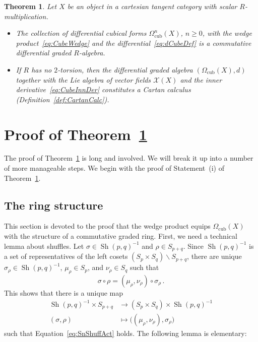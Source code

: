 \documentclass[12pt,reqno, a4paper]{amsart}
\numberwithin{equation}{section}
\theoremstyle{plain}
\newtheorem{Theorem}{Theorem}[section]
\theoremstyle{definition}
\theoremstyle{remark}
\DeclareMathOperator{\Shuff}{Sh}
\newcommand{\calX}{\mathcal{X}}
\begin{document}
\begin{Theorem}
\label{thm:CartanCube}
Let $X$ be an object in a cartesian tangent category with scalar $R$-multiplication.
\begin{itemize}

\item[(i)] The collection of differential cubical forms $\Omega^n_\mathrm{cub}(X)$, $n \geq 0$, with the wedge product~\eqref{eq:CubeWedge} and the differential~\eqref{eq:dCubeDef} is a commutative differential graded $R$-algebra.

\item[(ii)] If $R$ has no $2$-torsion, then the differential graded algebra $(\Omega_\mathrm{cub}(X), d)$ together with the Lie algebra of vector fields $\calX(X)$ and the inner derivative~\eqref{eq:CubeInnDer} constitutes a Cartan calculus (Definition~\ref{def:CartanCalc}).

\end{itemize}
\end{Theorem}




\section{Proof of Theorem~\ref{thm:CartanCube}}
\label{sec:Proof}

The proof of Theorem~\ref{thm:CartanCube} is long and involved. We will break it up into a number of more manageable steps. We begin with the proof of Statement~(i) of Theorem~\ref{thm:CartanCube}.

\subsection{The ring structure}
\label{sec:ProofRing}

This section is devoted to the proof that the wedge product equips $\Omega_\mathrm{cub}(X)$ with the structure of a commutative graded ring. First, we need a technical lemma about shuffles. Let $\sigma \in \Shuff(p,q)^{-1}$ and $\rho \in S_{p+q}$. Since $\Shuff(p,q)^{-1}$ is a set of representatives of the left cosets $(S_p \times S_q)\backslash S_{p+q}$, there are unique $\sigma_\rho \in \Shuff(p,q)^{-1}$, $\mu_\rho \in S_p$, and $\nu_\rho \in S_q$ such that
\begin{equation}
\label{eq:SnShuffAct}
  \sigma \circ \rho = (\mu_\rho, \nu_\rho) \circ \sigma_\rho
  \,.
\end{equation}
This shows that there is a unique map
\begin{equation}
\label{eq:ShuffIntertwine}
\begin{aligned}
  \Shuff(p,q)^{-1} \times S_{p+q}
  &\longrightarrow
  (S_p \times S_q) \times \Shuff(p,q)^{-1}
  \\
  (\sigma, \rho)
  &\longmapsto
  \bigl( (\mu_\rho, \nu_\rho), \sigma_\rho \bigr)
\end{aligned}
\end{equation}
such that Equation~\eqref{eq:SnShuffAct} holds. The following lemma is elementary:
\end{document}
